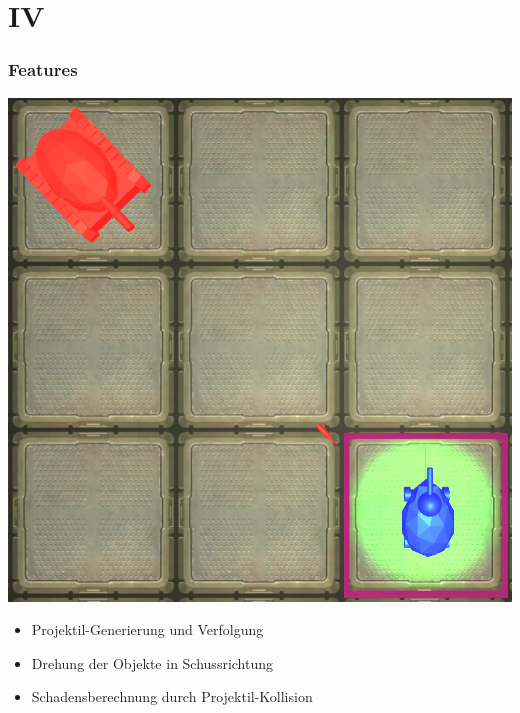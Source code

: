 ﻿\documentclass{beamer}
\begin{document}
\section{IV}
\begin{frame} %
  \frametitle{Features} %
  
	\begin{minipage}[]{0.45\textwidth}
		\includegraphics[width=\textwidth]{Abbildungen/BulletAndAngle.PNG}
	\end{minipage}
	\begin{minipage}[]{0.45\textwidth}
		\begin{itemize}
			\item Projektil-Generierung und Verfolgung
			\item Drehung der Objekte in Schussrichtung
			\item Schadensberechnung durch Projektil-Kollision
		\end{itemize}
	\end{minipage}
	
\end{frame}
\end{document}
